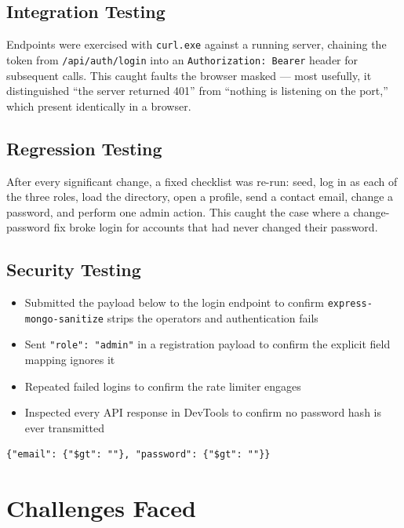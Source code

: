 \documentclass[11pt,letterpaper]{article}
\begin{document}
\subsection{Integration Testing}

Endpoints were exercised with \texttt{curl.exe} against a running server,
chaining the token from \texttt{/api/auth/login} into an
\texttt{Authorization: Bearer} header for subsequent calls. This caught faults
the browser masked --- most usefully, it distinguished ``the server returned
401'' from ``nothing is listening on the port,'' which present identically in
a browser.

\subsection{Regression Testing}

After every significant change, a fixed checklist was re-run: seed, log in as
each of the three roles, load the directory, open a profile, send a contact
email, change a password, and perform one admin action. This caught the case
where a change-password fix broke login for accounts that had never changed
their password.

\subsection{Security Testing}

\begin{itemize}
  \item Submitted the payload below to the login endpoint to confirm
        \texttt{express-mongo-sanitize} strips the operators and authentication fails
  \item Sent \texttt{"role": "admin"} in a registration payload to confirm the
        explicit field mapping ignores it
  \item Repeated failed logins to confirm the rate limiter engages
  \item Inspected every API response in DevTools to confirm no password hash is
        ever transmitted
\end{itemize}

\begin{Verbatim}[fontsize=\small,xleftmargin=1.5em]
{"email": {"$gt": ""}, "password": {"$gt": ""}}
\end{Verbatim}

\section{Challenges Faced}
\end{document}
